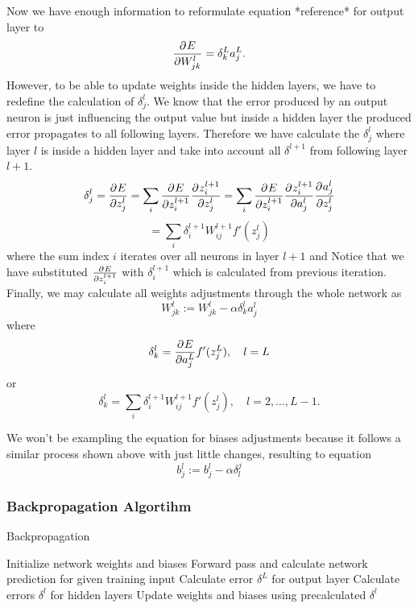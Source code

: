 Now we have enough information to reformulate equation *reference* for output layer to
\[ \frac{\partial^{} E}{\partial W_{jk}^l} = \delta_k^{L}a_j^L. \]
However, to be able to update weights inside the hidden layers, we have to redefine the calculation of $\delta_j^l$.
We know that the error produced by an output neuron is just influencing the output value but inside a hidden layer the produced error propagates to all following layers.
Therefore we have calculate the $\delta_j^l$ where layer $l$ is inside a hidden layer and take into account all $\delta^{l+1}$ from following layer $l+1$.
\[  \delta_j^l =  \frac{\partial^{} E}{\partial z_j^l} = \sum_i\frac{\partial^{} E}{\partial z_i^{l+1}}\frac{\partial^{} z_i^{l+1}}{\partial z_j^{l}} = \sum_i\frac{\partial^{} E}{\partial z_i^{l+1}}\frac{\partial^{} z_i^{l+1}}{\partial a_j^{l}}\frac{\partial^{} a_j^l}{\partial z_j^l} \]
\[  = \sum_i\delta_i^{l+1}W_{ij}^{l+1}f'(z_j^l) \]
where the sum index $i$ iterates over all neurons in layer $l+1$ and Notice that we have substituted $\frac{\partial^{} E}{\partial z_i^{l+1}}$ with $\delta_i^{l+1}$ which is calculated from previous iteration.
\newline
Finally, we may calculate all weights adjustments through the whole network as
\[  W_{jk}^l := W_{jk}^l - \alpha\delta_k^{l}a_j^l \]
where
\[ \delta_k^{l} = \frac{\partial^{} E}{\partial a_j^L}f'(z_j^L), \quad l = L \]
or
\[ \delta_k^{l} = \sum_i\delta_i^{l+1}W_{ij}^{l+1}f'(z_j^l), \quad l = 2,\ldots, L-1. \]

We won't be exampling the equation for biases adjustments because it follows a similar process shown above with just little changes, resulting to equation
\[  b_{j}^l := b_{j}^l - \alpha\delta_l^{j} \]

\clearpage

\subsubsection{Backpropagation Algortihm}

\begin{algorithm}
\caption{Backpropagation}\label{euclid}
\begin{algorithmic}[1]
\State Initialize network weights and biases
	\State Forward pass and calculate network prediction for given training input
	\State Calculate error $\delta^L$ for output layer
	\State Calculate errors $\delta^l$ for hidden layers
	\State Update weights and biases using precalculated $\delta^l$
\EndFor
\end{algorithmic}
\end{algorithm}
